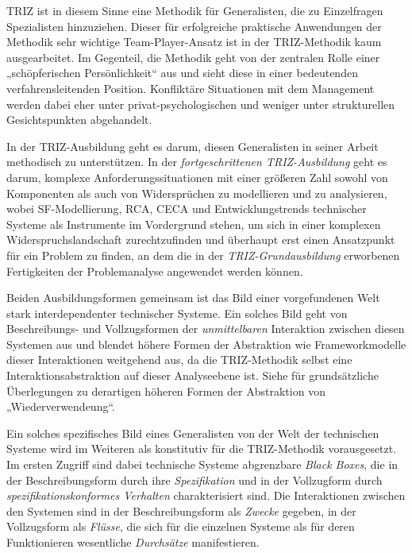 \documentclass[11pt,a4paper]{article}
\begin{document}
TRIZ ist in diesem Sinne eine Methodik für Generalisten, die zu Einzelfragen
Spezialisten hinzuziehen. Dieser für erfolgreiche praktische Anwendungen der
Methodik sehr wichtige Team-Player-Ansatz ist in der TRIZ-Methodik kaum
ausgearbeitet.  Im Gegenteil, die Methodik geht von der zentralen Rolle einer
„schöpferischen Persönlichkeit“ aus und sieht diese in einer bedeutenden
verfahrensleitenden Position. Konfliktäre Situationen mit dem Management
werden dabei eher unter privat-psychologischen und weniger unter strukturellen
Gesichtspunkten abgehandelt.

In der TRIZ-Ausbildung geht es darum, diesen Generalisten in seiner Arbeit
methodisch zu unterstützen. In der \emph{fortgeschrittenen TRIZ-Ausbildung}
geht es darum, komplexe Anforderungssituationen mit einer größeren Zahl sowohl
von Komponenten als auch von Widersprüchen zu modellieren und zu analysieren,
wobei SF-Modellierung, RCA, CECA und Entwicklungstrends technischer Systeme
als Instrumente im Vordergrund stehen, um sich in einer komplexen
Widerspruchslandschaft zurechtzufinden und überhaupt erst einen Ansatzpunkt
für ein Problem zu finden, an dem die in der \emph{TRIZ-Grundausbildung}
erworbenen Fertigkeiten der Problemanalyse angewendet werden können.

Beiden Ausbildungsformen gemeinsam ist das Bild einer vorgefundenen Welt stark
interdependenter technischer Systeme. Ein solches Bild geht von Beschreibungs-
und Vollzugsformen der \emph{unmittelbaren} Interaktion zwischen diesen
Systemen aus und blendet höhere Formen der Abstraktion wie Frameworkmodelle
dieser Interaktionen weitgehend aus, da die TRIZ-Methodik selbst eine
Interaktionsabstraktion auf dieser Analyseebene ist.  Siehe
\cite{Szyperski2002} für grundsätzliche Überlegungen zu derartigen höheren
Formen der Abstraktion von „Wiederverwendeung“.

Ein solches spezifisches Bild eines Generalisten von der Welt der technischen
Systeme wird im Weiteren als konstitutiv für die TRIZ-Methodik vorausgesetzt.
Im ersten Zugriff sind dabei technische Systeme abgrenzbare \emph{Black
  Boxes}, die in der Beschreibungsform durch ihre \emph{Spezifikation} und in
der Vollzugform durch \emph{spezifikationskonformes Verhalten} charakterisiert
sind.  Die Interaktionen zwischen den Systemen sind in der Beschreibungsform
als \emph{Zwecke} gegeben, in der Vollzugsform als \emph{Flüsse}, die sich für
die einzelnen Systeme als für deren Funktionieren wesentliche
\emph{Durchsätze} manifestieren.
\end{document}
